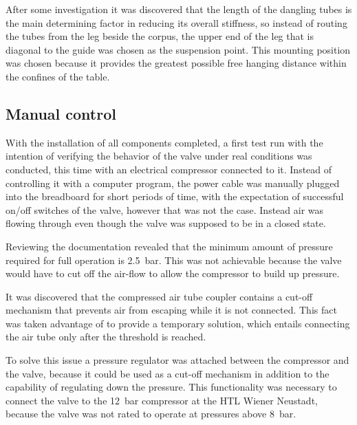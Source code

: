 After some investigation it was discovered that the length of the dangling tubes is the main determining factor in reducing its overall stiffness, so instead of routing the tubes from the leg beside the corpus, the upper end of the leg that is diagonal to the guide was chosen as the suspension point. This mounting position was chosen because it provides the greatest possible free hanging distance within the confines of the table.


\subsection{Manual control}
With the installation of all components completed, a first test run with the intention of verifying the behavior of the valve under real conditions was conducted, this time with an electrical compressor connected to it. Instead of controlling it with a computer program, the power cable was manually plugged into the breadboard for short periods of time, with the expectation of successful on/off switches of the valve, however that was not the case. Instead air was flowing through even though the valve was supposed to be in a closed state. 

Reviewing the documentation revealed that the minimum amount of pressure required for full operation is \SI{2,5}{\bar}. This was not achievable because the valve would have to cut off the air-flow to allow the compressor to build up pressure.

It was discovered that the compressed air tube coupler contains a cut-off mechanism that prevents air from escaping while it is not connected. This fact was taken advantage of to provide a temporary solution, which entails connecting the air tube only after the threshold is reached. 

To solve this issue a pressure regulator was attached between the compressor and the valve, because it could be used as a cut-off mechanism in addition to the capability of regulating down the pressure. This functionality was necessary to connect the valve to the \SI{12}{\bar} compressor at the HTL Wiener Neustadt, because the valve was not rated to operate at pressures above \SI{8}{\bar}.
